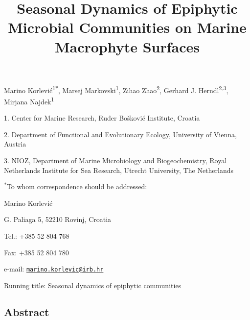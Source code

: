 \documentclass[
  12pt,
]{article}
\title{\textbf{Seasonal Dynamics of Epiphytic Microbial Communities on Marine
Macrophyte Surfaces}}
\author{}
\date{\vspace{-2.5em}}
\begin{document}
\maketitle

\vspace{20mm}

Marino Korlević\textsuperscript{1\(*\)}, Marsej
Markovski\textsuperscript{1}, Zihao Zhao\textsuperscript{2}, Gerhard J.
Herndl\textsuperscript{2,3}, Mirjana Najdek\textsuperscript{1}

1. Center for Marine Research, Ruđer Bošković Institute, Croatia

2. Department of Functional and Evolutionary Ecology, University of
Vienna, Austria

3. NIOZ, Department of Marine Microbiology and Biogeochemistry, Royal
Netherlands Institute for Sea Research, Utrecht University, The
Netherlands

\textsuperscript{\(*\)}To whom correspondence should be addressed:

Marino Korlević

G. Paliaga 5, 52210 Rovinj, Croatia

Tel.: +385 52 804 768

Fax: +385 52 804 780

e-mail:
\href{mailto:marino.korlevic@irb.hr}{\nolinkurl{marino.korlevic@irb.hr}}

Running title: Seasonal dynamics of epiphytic communities

\newpage
\linenumbers
{}
\setlength\parindent{24pt}
\doublespacing

\hypertarget{abstract}{%
\subsection{Abstract}\label{abstract}}
\end{document}
